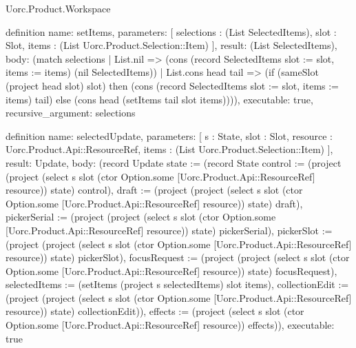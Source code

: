 \begin{lexlean}{Uorc.Product.Workspace}
\begin{semanticmodule}
definition{
  name: setItems,
  parameters: [
    selections : (List SelectedItems),
    slot : Slot,
    items : (List Uorc.Product.Selection::Item)
  ],
  result: (List SelectedItems),
  body: (match selections
    | List.nil => (cons (record SelectedItems {slot := slot, items := items}) (nil SelectedItems))
    | List.cons head tail => (if (sameSlot (project head slot) slot) then (cons (record SelectedItems {slot := slot, items := items}) tail) else (cons head (setItems tail slot items)))),
  executable: true,
  recursive_argument: selections
}

definition{
  name: selectedUpdate,
  parameters: [
    s : State,
    slot : Slot,
    resource : Uorc.Product.Api::ResourceRef,
    items : (List Uorc.Product.Selection::Item)
  ],
  result: Update,
  body: (record Update {state := (record State {control := (project (project (select s slot (ctor Option.some [Uorc.Product.Api::ResourceRef] resource)) state) control), draft := (project (project (select s slot (ctor Option.some [Uorc.Product.Api::ResourceRef] resource)) state) draft), pickerSerial := (project (project (select s slot (ctor Option.some [Uorc.Product.Api::ResourceRef] resource)) state) pickerSerial), pickerSlot := (project (project (select s slot (ctor Option.some [Uorc.Product.Api::ResourceRef] resource)) state) pickerSlot), focusRequest := (project (project (select s slot (ctor Option.some [Uorc.Product.Api::ResourceRef] resource)) state) focusRequest), selectedItems := (setItems (project s selectedItems) slot items), collectionEdit := (project (project (select s slot (ctor Option.some [Uorc.Product.Api::ResourceRef] resource)) state) collectionEdit)}), effects := (project (select s slot (ctor Option.some [Uorc.Product.Api::ResourceRef] resource)) effects)}),
  executable: true
}


\end{semanticmodule}
\end{lexlean}
